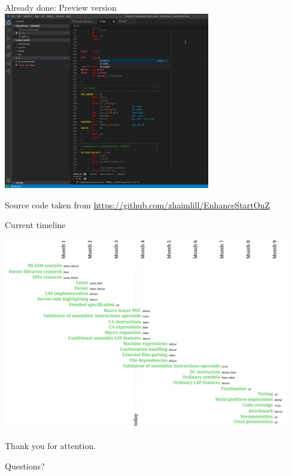 \documentclass[10pt]{beamer}
\begin{document}
\begin{frame}{Already done: Preview version}
\centering
\includegraphics[width=9cm]{img/screenshot}

\footnotesize
Source code taken from \url{https://github.com/zhaimlill/EnhanceStartOnZ}
\end{frame}


\begin{frame}{Current timeline}

\centering
\hspace*{-0.95cm}
\includegraphics[width=12.5cm]{img/timeline}

\end{frame}


\begin{frame}[standout]

  Thank you for attention.

  \small Questions?
\end{frame}
\end{document}
